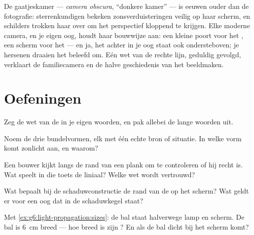 \begin{remark}\label{rem:g6:light-propagation:history}
De gaatjeskamer --- \emph{camera obscura}, ``donkere kamer'' --- is
eeuwen ouder dan de fotografie: sterrenkundigen bekeken
zonsverduisteringen veilig op haar scherm, en schilders trokken haar
 over om het perspectief kloppend te krijgen. Elke moderne
camera, en je eigen oog, houdt haar bouwwijze aan: een kleine poort
voor het , een scherm voor het  --- en ja, het
 achter in je oog staat ook ondersteboven; je hersenen draaien
het beleefd om. Eén wet van de rechte lijn, geduldig gevolgd,
verklaart de familiecamera en de halve geschiedenis van het
beeldmaken.
\end{remark}

\section{Oefeningen}

\begin{exercise}[$\star$]\label{exo:g6:light-propagation:1}
Zeg de wet van de  in je eigen woorden, en
pak allebei de lange woorden uit.
\end{exercise}

\begin{exercise}[$\star$]\label{exo:g6:light-propagation:2}
Noem de drie bundelvormen, elk met één echte bron of situatie. In
welke vorm komt zonlicht aan, en waarom?
\end{exercise}

\begin{exercise}[$\star$]\label{exo:g6:light-propagation:3}
Een bouwer kijkt langs de rand van een plank om te controleren of hij
recht is. Wat speelt in die toets de liniaal? Welke wet wordt
vertrouwd?
\end{exercise}

\begin{exercise}[$\star$]\label{exo:g6:light-propagation:4}
Wat bepaalt bij de schaduwconstructie de rand van de  op het
scherm? Wat geldt er voor een oog dat in de schaduwkegel staat?
\end{exercise}

\begin{exercise}[$\star$]\label{exo:g6:light-propagation:5}
Met \cref{ex:g6:light-propagation:sizes}: de bal staat halverwege lamp
en scherm. De bal is \qty{6}{cm} breed --- hoe breed is zijn
? En als de bal dicht bij het scherm komt?
\end{exercise}

